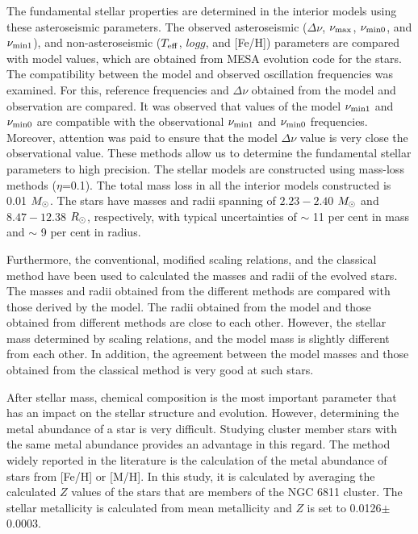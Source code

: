 \documentclass[a4paper,fleqn,usenatbib]{mnras}     %
\begin{document}
{The fundamental stellar properties 
 are determined in the interior models using 
these asteroseismic parameters.
The observed asteroseismic 
($\Delta\nu$, ${\nu_{\rm max}}$,  ${\nu_{\rm min0}}$, and ${\nu_{\rm min1}}$), and non-asteroseismic ($T_{\rm eff}$, $log g$, and [Fe/H]) parameters are compared with model values, which are obtained from {\small {MESA}} evolution 
code for the stars.
The compatibility between the model and
observed oscillation frequencies was examined.
For this, reference frequencies
and $\Delta\nu$ obtained from the model and observation are compared.
It was observed that values of the model 
${\nu_{\rm min1}}$ and ${\nu_{\rm min0}}$ are
compatible with the observational ${\nu_{\rm min1}}$ and ${\nu_{\rm min0}}$ frequencies.
Moreover, attention was paid to ensure that the model $\Delta\nu$ value is very close the observational value.
These methods allow us to 
determine the fundamental
 stellar parameters to high precision. 
The stellar
models are constructed using mass-loss methods ($\eta$=0.1).
The total mass loss in all the interior
models constructed is 0.01 $M_{\rm \odot}$.
The stars have masses and radii spanning of  
$2.23-2.40$ $M_{\rm \odot}$ and $8.47-12.38$ $R_{\rm \odot}$, 
respectively, with typical uncertainties of $\sim$ 11 per cent in mass and $\sim$ 9 per cent in radius.

Furthermore, the conventional, modified scaling relations, 
and the classical method have been used to calculated 
the masses and radii of the evolved stars.
The masses and radii obtained 
from the different methods are compared with those derived by the model.
The radii obtained from the 
model and those obtained from 
different methods are close to each other. 
However, the stellar mass determined by scaling relations, 
and the model mass is slightly different from each other.
In addition, the agreement between the model masses
and those  obtained from the classical method is very good at such stars.

After stellar mass, chemical composition is the most important 
parameter 
that has an impact on the stellar structure and evolution.
However, determining the metal abundance of a star is very difficult.
Studying cluster member stars with the 
same metal abundance provides an advantage in this regard.
The method widely reported in the
literature is the calculation of the
metal abundance of stars from [Fe/H] or [M/H].
In this study, it is calculated by averaging 
the calculated $Z$ values of the stars that are 
members of the NGC 6811 cluster.
The stellar metallicity
is calculated from mean metallicity and 
$Z$  is set to 0.0126$\pm$0.0003.

}
\end{document}
